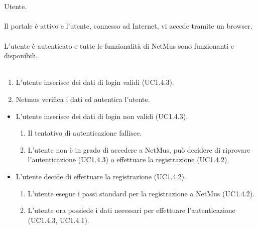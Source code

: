 \vspace{1cm}
\\\\
 Utente. \\\\
 Il portale \`e attivo e l'utente, connesso ad Internet, vi
accede tramite un browser. \\\\
 L'utente \`e autenticato e tutte le funzionalit\`a di
NetMus sono funzionanti e disponibili. \\\\
\begin{enumerate}
  \item L'utente inserisce dei dati di login validi (UC1.4.3).
  \item Netmus verifica i dati ed autentica l'utente.
\end{enumerate}
\begin{itemize}
  \item L'utente inserisce dei dati di login non validi (UC1.4.3).
  \begin {enumerate}
    \item Il tentativo di autenticazione fallisce.
    \item L'utente non \`e in grado di accedere a NetMus, pu\`o decidere di
    riprovare l'autenticazione (UC1.4.3) o effettuare la registrazione
    (UC1.4.2).
  \end{enumerate}
  \item L'utente decide di effettuare la registrazione (UC1.4.2).
  \begin {enumerate}
    \item L'utente esegue i passi standard per la registrazione a NetMus
    (UC1.4.2).
    \item L'utente ora possiede i dati necessari per effettuare l'autenticazione (UC1.4.3, UC1.4.1).
  \end{enumerate}
\end{itemize}
\newpage


